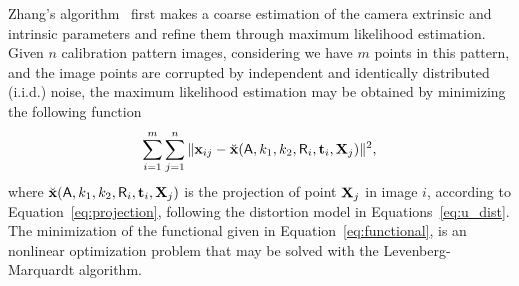 Zhang's algorithm~\cite{Zhang2000}
first makes a coarse estimation of the camera extrinsic and intrinsic parameters and refine them through maximum likelihood estimation.
Given $n$ calibration pattern images, considering we have $m$ points in this pattern, and the image points are corrupted by independent and identically distributed (i.i.d.) noise,
the maximum likelihood estimation may be obtained by minimizing the following function~\cite{Zhang2000a}
%
\begin{equation}
  \sum_{i=1}^{m}\sum_{j=1}^{n} \Vert \mathbf{x}_{ij} - \breve{\mathbf{x}}(\mathsf{A}, k_1, k_2, \mathsf{R}_i, \mathbf{t}_i, \mathbf{X}_j) \Vert^2
 \label{eq:functional},
\end{equation}
where $\breve{\mathbf{x}}(\mathsf{A}, k_1, k_2, \mathsf{R}_i, \mathbf{t}_i, \mathbf{X}_j)$ is the projection of point $\mathbf{X}_j$ in image $i$, according to Equation~\eqref{eq:projection},
following the distortion model in Equations~\eqref{eq:u_dist}. %
The minimization of the functional given in Equation~\eqref{eq:functional}, is an nonlinear optimization problem that may be solved with the Levenberg-Marquardt algorithm.

%


